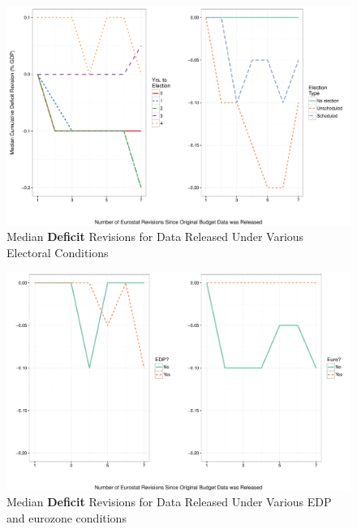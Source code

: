 \documentclass[]{article}
\begin{document}
\begin{figure}
    \begin{center}
        \caption{Median \textbf{Deficit} Revisions for Data Released Under Various Electoral Conditions}
        \label{median_deficit_revisions}
        \includegraphics[scale=0.55]{figures/median_deficit_revisions.pdf}
    \end{center}
\end{figure}

\begin{figure}
    \begin{center}
        \caption{Median \textbf{Deficit} Revisions for Data Released Under Various EDP and eurozone conditions}
        \label{median_deficit_revisions_euro_edp}
        \includegraphics[scale=0.55]{figures/median_deficit_revisions_edp_euro.pdf}
    \end{center}
\end{figure}
\end{document}

